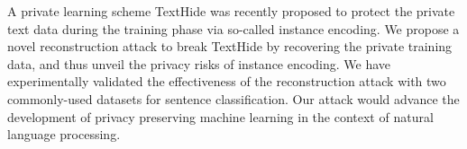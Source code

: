 A private learning scheme TextHide was recently proposed to protect the private text data during the training phase via so-called instance encoding. We propose a novel reconstruction attack to break TextHide by recovering the private training data, and thus unveil the privacy risks of instance encoding. We have experimentally validated the effectiveness of the reconstruction attack with two commonly-used datasets for sentence classification. Our attack would advance the development of privacy preserving machine learning in the context of natural language processing.
